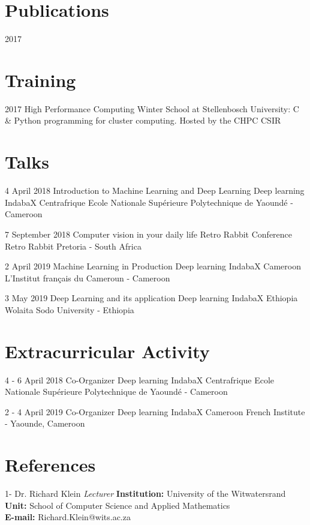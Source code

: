 \documentclass[letterpaper]{moderncv}        %
\begin{document}
	
\section{Publications}
\cventry
{2017}
{}
{}
{}
{}
{}

\section{Training}
\cventry
{2017}
{High Performance Computing Winter School at Stellenbosch University: C \& Python programming for cluster computing.}
{Hosted by the CHPC}
{CSIR}
{}
{}

\section{Talks}
\cventry
{4 April 2018}
{Introduction to Machine Learning and Deep Learning}
{Deep learning IndabaX Centrafrique}
{Ecole Nationale Supérieure Polytechnique de Yaoundé - Cameroon}
{}
{}

\cventry
{7 September 2018}
{Computer vision in your daily life}
{Retro Rabbit Conference}
{Retro Rabbit Pretoria - South Africa}
{}
{}

\cventry
{2 April 2019}
{Machine Learning in Production}
{Deep learning IndabaX Cameroon}
{L'Institut français du Cameroun - Cameroon}
{}
{}

\cventry
{3 May 2019}
{Deep Learning and its application}
{Deep learning IndabaX Ethiopia}
{Wolaita Sodo University - Ethiopia}
{}
{}
	
\section{Extracurricular Activity}	
\cventry
{4 - 6 April 2018}
{Co-Organizer Deep learning IndabaX Centrafrique}
{Ecole Nationale Supérieure Polytechnique de Yaoundé - Cameroon}
{}
{}
{}

\cventry
{2 - 4 April 2019}
{Co-Organizer Deep learning IndabaX Cameroon}
{French Institute - Yaounde, Cameroon}
{}
{}
{}

\section{References}
\cventry
{1-}
{Dr. Richard Klein}
{}
{\textit{Lecturer}}
{}
{\textbf{Institution:} University of the Witwatersrand\\
	\textbf{Unit:} School of Computer Science and Applied Mathematics\\
	\textbf{E-mail:} Richard.Klein@wits.ac.za}
\vspace{1mm}
\end{document}
